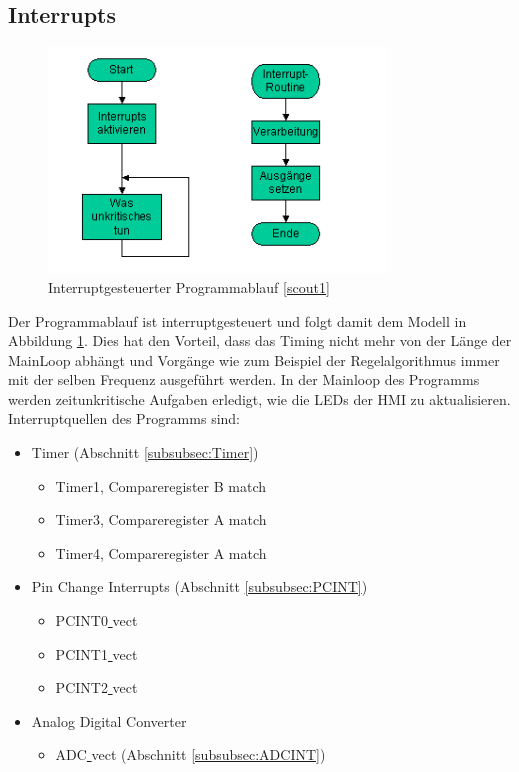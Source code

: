 \documentclass[a4paper, 11pt]{report}
\begin{document}
		\subsection{Interrupts}
		\begin{figure}[ht]
			\centering
			\includegraphics[width=0.8\textwidth]{rec/Interrupt_Programme.png}
			\caption[Interruptgesteuerter Programmablauf]{Interruptgesteuerter Programmablauf \hyperref[src:scout1]{[scout1]}}
			\label{InterruptgesteuerterProgrammablauf}
		\end{figure}
Der Programmablauf ist interruptgesteuert und folgt damit dem Modell in Abbildung \ref{InterruptgesteuerterProgrammablauf}.
			Dies hat den Vorteil, dass das Timing nicht mehr von der Länge der MainLoop abhängt und Vorgänge wie zum  Beispiel der Regelalgorithmus immer mit der selben Frequenz ausgeführt werden.
			In der Mainloop des Programms werden zeitunkritische Aufgaben erledigt, wie die LEDs der HMI zu aktualisieren.
			Interruptquellen des Programms sind:
			\begin{itemize}
				\item Timer  (Abschnitt \ref{subsubsec:Timer})
				\begin{itemize}
					\item[1.] Timer1, Compareregister B match
					\item[2.] Timer3, Compareregister A match
					\item[3.] Timer4, Compareregister A match
				\end{itemize}
				\item Pin Change Interrupts (Abschnitt \ref{subsubsec:PCINT})
				\begin{itemize}
					\item[4.] PCINT0\underline{ }vect
					\item[5.] PCINT1\underline{ }vect
					\item[6.] PCINT2\underline{ }vect
				\end{itemize}
				\item Analog Digital Converter
				\begin{itemize}
					\item[7.] ADC\underline{ }vect  (Abschnitt \ref{subsubsec:ADCINT})
				\end{itemize}

			\end{itemize}
\end{document}
